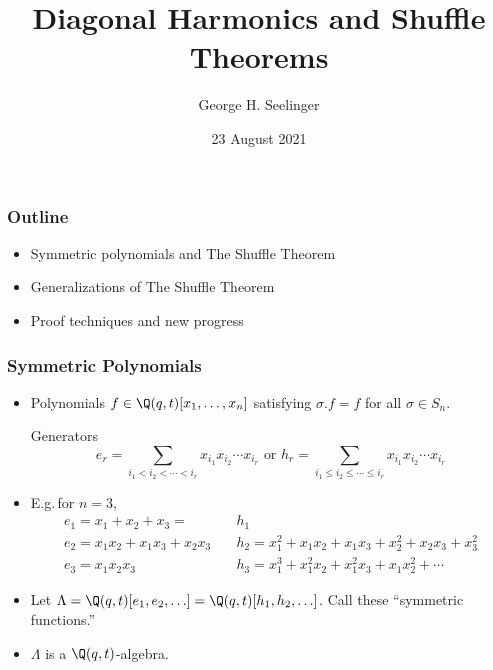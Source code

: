 \documentclass{beamer}
\title[Shuffle Theorems]{Diagonal Harmonics and Shuffle Theorems} %
\author[George H. Seelinger]{George H. Seelinger} %
\institute[UMich] %
{
  \medskip
\textit{ghseeli@umich.edu}\\ %
\medskip
  on joint work with Jonah Blasiak, Mark Haiman, Jennifer Morse, and Anna
  Pun\\
  arXiv:2102.07931\\
  \medskip
Capsule Research Talk%
}
\date{23 August 2021} %
\DeclareMathOperator{\Gr}{Gr}
\newcommand{\sym}{\Lambda}
\newcounter{c}
\begin{document}
\begin{frame}
 \titlepage 
\end{frame}
\begin{frame}
  \frametitle{Outline}
  \begin{itemize}
  \item Symmetric polynomials and The Shuffle Theorem
  \item Generalizations of The Shuffle Theorem
  \item Proof techniques and new progress
  \end{itemize}
\end{frame}
\begin{frame}
  \frametitle{Symmetric Polynomials}
  \begin{itemize}
  \item Polynomials \(f \in \Q(q,t)[x_1,\ldots,x_n]\) satisfying \(\sigma.f
    = f\) for all \(\sigma \in S_n\).\pause
    \begin{block}{Generators}
    \[
      e_r =
      \sum_{i_1 < i_2 < \cdots < i_r} x_{i_1} x_{i_2} \cdots x_{i_r}
      \text { or }
      h_r = 
      \sum_{i_1 \leq i_2 \leq \cdots \leq i_r} x_{i_1} x_{i_2} \cdots x_{i_r}
    \]\pause 
  \end{block}
    \item E.g.\,for \(n=3\),
    \begin{align*}
      e_1 = x_1 + x_2 + x_3 = & h_1  \\
      e_2 = x_1 x_2 + x_1 x_3 + x_2 x_3 \quad & h_2 = x_1^2 + x_1 x_2 + x_1
                                          x_3 + x_2^2 +  x_2 x_3 +x_3^2  \\
      e_3 = x_1 x_2 x_3 \quad & h_3 = x_1^3 + x_1^2 x_2 + x_1^2 x_3 + x_1
                          x_2^2 + \cdots
    \end{align*} \pause
    \item Let \(\sym =
      \Q(q,t)[e_1,e_2,\ldots] = \Q(q,t)[h_1,h_2,\ldots]\). Call these
      ``symmetric functions.''\pause
    \item \(\sym\) is a \(\Q(q,t)\)-algebra.
  \end{itemize}
\end{frame}
\end{document}
